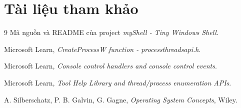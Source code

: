 \documentclass[13pt,a4paper,oneside]{extreport}
\begin{document}
\chapter*{Tài liệu tham khảo}

\begin{thebibliography}{9}
	Mã nguồn và README của project \textit{myShell - Tiny Windows Shell}.

	Microsoft Learn, \textit{CreateProcessW function - processthreadsapi.h}.

	Microsoft Learn, \textit{Console control handlers and console control events}.

	Microsoft Learn, \textit{Tool Help Library and thread/process enumeration APIs}.

	A. Silberschatz, P. B. Galvin, G. Gagne, \textit{Operating System Concepts}, Wiley.
\end{thebibliography}
\end{document}
